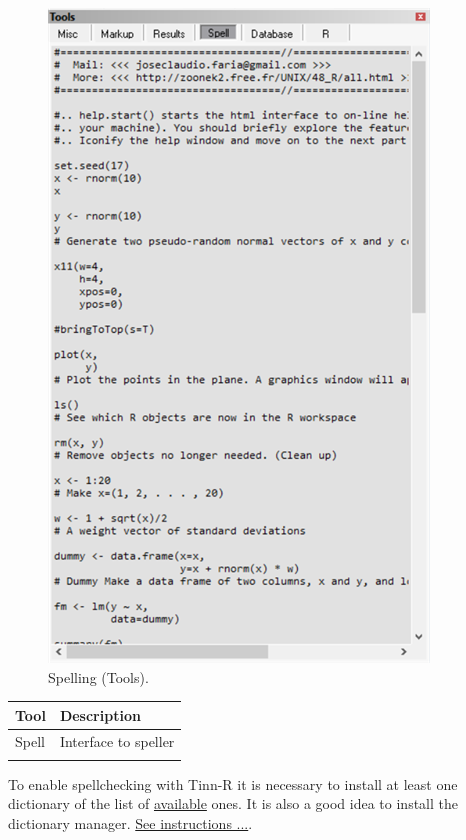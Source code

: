 \begin{figure}[H]
  \includegraphics[scale=0.35]{./res/tools_spell.png}
  \caption{Spelling (Tools).}
  \label{fig:tools_spell}
\end{figure}

\begin{footnotesize}
  \begin{tabularx}{\textwidth}{>{\hsize=0.3\hsize}X>{\hsize=0.7\hsize}X}\\
    \hline
    \textbf{Tool} & \textbf{Description} \\
    \hline
    Spell & Interface to speller \\
    \hline
    \\
  \end{tabularx}
\end{footnotesize}

To enable spellchecking with Tinn-R it is necessary to install at
least one dictionary of the list of
\href{http://www.luziusschneider.com/Speller/English/index.htm}{available} ones.
It is also a good idea to install the dictionary manager.
\href{\#configuration\_spellerinstalation}{See instructions ...}.


